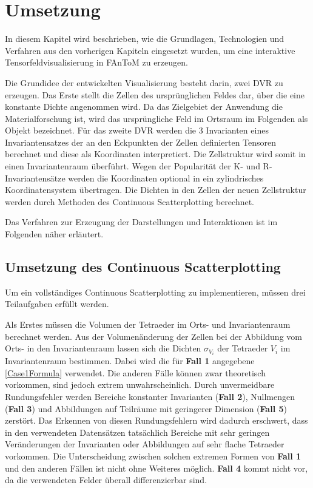 \documentclass[a4paper,fontsize=12pt,toc=bib,parskip=half,ngerman]{scrartcl}
\begin{document}
\section{Umsetzung}
\label{sec:Umsetzung}
In diesem Kapitel wird beschrieben, wie die Grundlagen, Technologien und Verfahren aus den vorherigen Kapiteln eingesetzt wurden, um eine interaktive Tensorfeldvisualisierung in FAnToM zu erzeugen.

Die Grundidee der entwickelten Visualisierung besteht darin, zwei DVR zu erzeugen. Das Erste stellt die Zellen des urspr\"unglichen Feldes dar, \"uber die eine konstante Dichte angenommen wird. Da das Zielgebiet der Anwendung die Materialforschung ist, wird das urspr\"ungliche Feld im Ortsraum im Folgenden als \glq Objekt\grq{} bezeichnet. F\"ur das zweite DVR werden die 3 Invarianten eines Invariantensatzes der an den Eckpunkten der Zellen definierten Tensoren berechnet und diese als Koordinaten interpretiert. Die Zellstruktur wird somit in einen \glq Invariantenraum\grq{} \"uberf\"uhrt. Wegen der Popularit\"at der K- und R-Invariantens\"atze werden die Koordinaten optional in ein zylindrisches Koordinatensystem \"ubertragen. Die Dichten in den Zellen der neuen Zellstruktur werden durch Methoden des Continuous Scatterplotting berechnet.

Das Verfahren zur Erzeugung der Darstellungen und Interaktionen ist im Folgenden n\"aher erl\"autert.

\subsection{Umsetzung des Continuous Scatterplotting}
\label{CSPImplementation}
Um ein vollst\"andiges Continuous Scatterplotting zu implementieren, m\"ussen drei Teilaufgaben erf\"ullt werden.

Als Erstes m\"ussen die Volumen der Tetraeder im Orts- und Invariantenraum berechnet werden. Aus der Volumen\"anderung der Zellen bei der Abbildung vom Orts- in den Invariantenraum  lassen sich die Dichten $\sigma_{V_i}$ der Tetraeder $V_i$ im Invariantenraum bestimmen. Dabei wird die f\"ur \textbf{Fall 1} angegebene \cref{Case1Formula} verwendet. Die anderen F\"alle k\"onnen zwar theoretisch vorkommen, sind jedoch extrem unwahrscheinlich. Durch unvermeidbare Rundungsfehler werden Bereiche konstanter Invarianten (\textbf{Fall 2}), Nullmengen (\textbf{Fall 3}) und Abbildungen auf Teilr\"aume mit geringerer Dimension (\textbf{Fall 5}) zerst\"ort. Das Erkennen von diesen Rundungsfehlern wird dadurch erschwert, dass in den verwendeten Datens\"atzen tats\"achlich Bereiche mit sehr geringen Ver\"anderungen der Invarianten oder Abbildungen auf sehr flache Tetraeder vorkommen. Die Unterscheidung zwischen solchen extremen Formen von \textbf{Fall 1} und den anderen F\"allen ist nicht ohne Weiteres m\"oglich. \textbf{Fall 4} kommt nicht vor, da die verwendeten Felder \"uberall differenzierbar sind.
\end{document}
